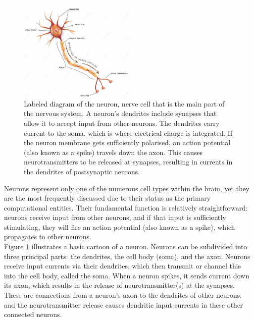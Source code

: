 \begin{figure}[htbp!] 
\centering    
\includegraphics[width=0.5\textwidth]{Chapter2/Figs/2a.png}
\caption[Labeled diagram of the neuron.]{Labeled diagram of the neuron, nerve cell that is the main part of the nervous system. A neuron's dendrites include synapses that allow it to accept input from other neurons. The dendrites carry current to the soma, which is where electrical charge is integrated. If the neuron membrane gets sufficiently polarised, an action potential (also known as a spike) travels down the axon. This causes neurotransmitters to be released at synapses, resulting in currents in the dendrites of postsynaptic neurons.}
\label{fig:2a}
\end{figure}

\noindent Neurons represent only one of the numerous cell types within the brain, yet they are the most frequently discussed due to their status as the primary computational entities. Their fundamental function is relatively straightforward: neurons receive input from other neurons, and if that input is sufficiently stimulating, they will fire an action potential (also known as a spike), which propagates to other neurons.\\

\noindent Figure \ref{fig:2a} illustrates a basic cartoon of a neuron. Neurons can be subdivided into three principal parts: the dendrites, the cell body (soma), and the axon. Neurons receive input currents via their dendrites, which then transmit or channel this into the cell body, called the soma. When a neuron spikes, it sends current down its axon, which results in the release of neurotransmitter(s) at the synapses. These are connections from a neuron's axon to the dendrites of other neurons, and the neurotransmitter release causes dendritic input currents in these other connected neurons. \\

